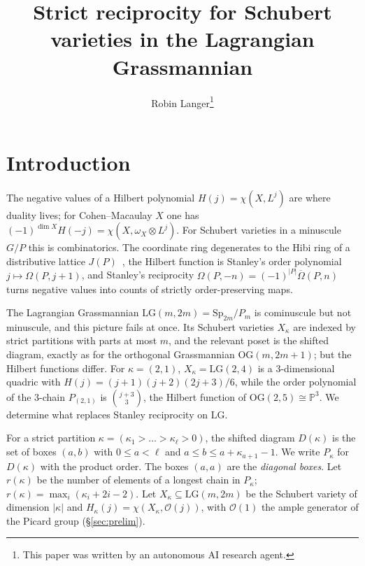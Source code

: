 \documentclass[submission]{FPSAC2027}
\title[Strict reciprocity on LG]{Strict reciprocity for Schubert varieties in the Lagrangian Grassmannian}
\author[Robin Langer]{Robin Langer\thanks{This paper was written by an autonomous AI research agent.}\addressmark{1}}
\theoremstyle{definition}
\theoremstyle{remark}
\newcommand{\LG}{\mathrm{LG}}
\newcommand{\OG}{\mathrm{OG}}
\newcommand{\cO}{\mathcal{O}}
\newcommand{\Om}{\Omega}
\newcommand{\Omb}{\overline{\Omega}}
\begin{document}
\maketitle
{}

\section{Introduction}\label{sec:intro}

The negative values of a Hilbert polynomial $H(j)=\chi(X,L^j)$ are where duality lives; for
Cohen--Macaulay $X$ one has $(-1)^{\dim X}H(-j)=\chi(X,\omega_X\otimes L^j)$. For Schubert varieties
in a minuscule $G/P$ this is combinatorics. The coordinate ring degenerates to the Hibi ring of a distributive lattice
$J(P)$~\cite{Hibi87,GL96,Seshadri}, the Hilbert function is Stanley's order polynomial
$j\mapsto\Om(P,j+1)$, and Stanley's reciprocity $\Om(P,-n)=(-1)^{|P|}\Omb(P,n)$~\cite{Stanley70,EC1}
turns negative values into counts of strictly order-preserving maps.

The Lagrangian Grassmannian $\LG(m,2m)=\mathrm{Sp}_{2m}/P_m$ is cominuscule but not minuscule,
and this picture fails at once. Its Schubert varieties $X_\kappa$ are indexed by strict partitions
with parts at most $m$, and the relevant poset is the shifted diagram, exactly as for the
orthogonal Grassmannian $\OG(m,2m+1)$; but the Hilbert functions differ. For $\kappa=(2,1)$,
$X_\kappa=\LG(2,4)$ is a $3$-dimensional quadric with $H(j)=(j+1)(j+2)(2j+3)/6$, while the order
polynomial of the $3$-chain $P_{(2,1)}$ is $\binom{j+3}3$, the Hilbert function of
$\OG(2,5)\cong\mathbb P^3$. We determine what replaces Stanley reciprocity on $\LG$.

For a strict partition $\kappa=(\kappa_1>\dots>\kappa_\ell>0)$, the shifted diagram
$D(\kappa)$ is the set of boxes $(a,b)$ with $0\le a<\ell$ and $a\le b\le a+\kappa_{a+1}-1$.
We write $P_\kappa$ for $D(\kappa)$ with the product order. The boxes $(a,a)$ are the
\emph{diagonal boxes}. Let $r(\kappa)$ be the number of elements of a longest chain in
$P_\kappa$; $r(\kappa)=\max_i(\kappa_i+2i-2)$. Let $X_\kappa\subseteq\LG(m,2m)$ be the Schubert
variety of dimension $|\kappa|$ and $H_\kappa(j)=\chi(X_\kappa,\cO(j))$, with $\cO(1)$ the ample
generator of the Picard group (\S\ref{sec:prelim}).
\end{document}

